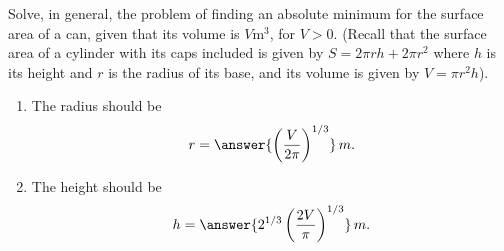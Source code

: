 \documentclass{ximera}
\author{Gregory Hartman \and Matthew Carr}
\begin{document}
\begin{exercise}




Solve, in general, the problem of finding an absolute minimum for the surface area of a can, given that its volume is $V$m$^3$, for $V>0$. (Recall that the surface area of a cylinder with its caps included is given by $S=2\pi r h+2\pi r^2$ where $h$ is its height and $r$ is the radius of its base, and its volume is given by $V=\pi r^2 h$).

\begin{enumerate}
\item		The radius should be\[r=\answer{\left(\frac{V}{2\pi}\right)^{1/3}}\,m.\]
\item		The height should be \[h=\answer{2^{1/3}\left(\frac{2V}{\pi}\right)^{1/3}}\,m.\]
\end{enumerate}

\end{exercise}
\end{document}
